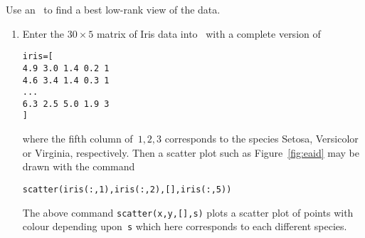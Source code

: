 \begin{example}
\begin{solution} 
Use an \svd\ to find a best low-rank view of the data.
\begin{enumerate}
\item Enter the \(30\times5\) matrix of Iris data into \script\  with a complete version of
\begin{verbatim}
iris=[
4.9 3.0 1.4 0.2 1
4.6 3.4 1.4 0.3 1
...
6.3 2.5 5.0 1.9 3
]
\end{verbatim}
where the fifth column of~\(1,2,3\) corresponds to the species Setosa, Versicolor or Virginia, respectively.
\setbox\ajrqrbox\hbox{}%
\marginpar{\usebox{\ajrqrbox\\[2ex]}}%
Then a scatter plot such as Figure~\ref{fig:eaid} may be drawn with the command
\begin{verbatim}
scatter(iris(:,1),iris(:,2),[],iris(:,5))
\end{verbatim}
The above command \verb|scatter(x,y,[],s)|  plots a scatter plot of points with colour depending upon~\verb|s| which here corresponds to each different species.


\end{enumerate}
\end{solution}
\end{example}
